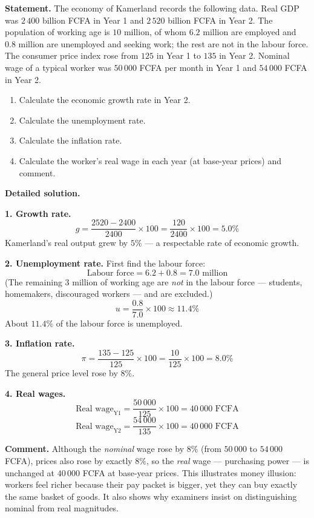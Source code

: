 \documentclass[11pt]{article}
\newcommand{\cle}[1]{{\popxbold\color{popdark}#1}}
\begin{document}
\begin{exoresolu}
\textbf{Statement.} The economy of Kamerland records the following data. Real GDP was $2\,400$ billion FCFA in Year 1 and $2\,520$ billion FCFA in Year 2. The population of working age is $10$ million, of whom $6.2$ million are employed and $0.8$ million are unemployed and seeking work; the rest are not in the labour force. The consumer price index rose from $125$ in Year 1 to $135$ in Year 2. Nominal wage of a typical worker was $50\,000$ FCFA per month in Year 1 and $54\,000$ FCFA in Year 2.
\begin{enumerate}
\item Calculate the economic growth rate in Year 2.
\item Calculate the unemployment rate.
\item Calculate the inflation rate.
\item Calculate the worker's real wage in each year (at base-year prices) and comment.
\end{enumerate}
\tcblower
\textbf{Detailed solution.}

\textbf{1. Growth rate.}
\[ g = \frac{2520 - 2400}{2400} \times 100 = \frac{120}{2400} \times 100 = 5.0\% \]
Kamerland's real output grew by $5\%$ — a respectable rate of economic growth.

\textbf{2. Unemployment rate.} First find the labour force:
\[ \text{Labour force} = 6.2 + 0.8 = 7.0 \text{ million} \]
(The remaining $3$ million of working age are \emph{not} in the labour force — students, homemakers, discouraged workers — and are excluded.)
\[ u = \frac{0.8}{7.0} \times 100 \approx 11.4\% \]
About $11.4\%$ of the labour force is unemployed.

\textbf{3. Inflation rate.}
\[ \pi = \frac{135 - 125}{125} \times 100 = \frac{10}{125} \times 100 = 8.0\% \]
The general price level rose by $8\%$.

\textbf{4. Real wages.}
\[ \text{Real wage}_{\text{Y1}} = \frac{50\,000}{125} \times 100 = 40\,000 \text{ FCFA} \]
\[ \text{Real wage}_{\text{Y2}} = \frac{54\,000}{135} \times 100 = 40\,000 \text{ FCFA} \]

\textbf{Comment.} Although the \emph{nominal} wage rose by $8\%$ (from $50\,000$ to $54\,000$ FCFA), prices also rose by exactly $8\%$, so the \emph{real} wage — purchasing power — is unchanged at $40\,000$ FCFA at base-year prices. This illustrates \cle{money illusion}: workers feel richer because their pay packet is bigger, yet they can buy exactly the same basket of goods. It also shows why examiners insist on distinguishing nominal from real magnitudes.
\end{exoresolu}
\end{document}
